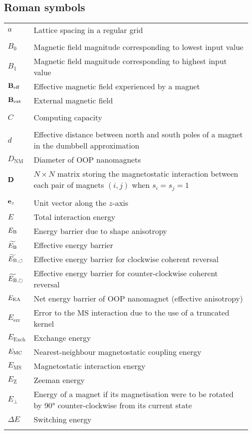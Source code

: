 \subsection*{Roman symbols}
\begin{longtable}[l]{p{60pt} p{350pt}}
	$a$ & Lattice spacing in a regular grid \\
	&\\

	$B_0$ & Magnetic field magnitude corresponding to lowest input value \\
	$B_1$ & Magnetic field magnitude corresponding to highest input value \\
	$\boldsymbol{\mathbf{B}}_\mathrm{eff}$ & Effective magnetic field experienced by a magnet \\
	$\boldsymbol{\mathbf{B}}_\mathrm{ext}$ & External magnetic field \\
	&\\
	
	$C$ & Computing capacity \\
	&\\

	$d$ & Effective distance between north and south poles of a magnet in the dumbbell approximation \\
	$D_\mathrm{NM}$ & Diameter of OOP nanomagnets \\
	$\boldsymbol{\mathbf{D}}$ & $N \times N$ matrix storing the magnetostatic interaction between each pair of magnets $(i,j)$ when $s_i=s_j=1$ \\
	&\\

	$\boldsymbol{\mathbf{e}}_z$ & Unit vector along the $z$-axis \\
	$E$ & Total interaction energy \\
	$E_\mathrm{B}$ & Energy barrier due to shape anisotropy \\ %
	$\widetilde{E_\mathrm{B}}$ & Effective energy barrier \\
	$\widetilde{E_\mathrm{B}}{}_{,\circlearrowleft}$ & Effective energy barrier for clockwise coherent reversal \\
	$\widetilde{E_\mathrm{B}}{}_{,\circlearrowright}$ & Effective energy barrier for counter-clockwise coherent reversal \\
	$E_\mathrm{EA}$ & Net energy barrier of OOP nanomagnet (effective anisotropy) \\
	$E_\mathrm{err}$ & Error to the MS interaction due to the use of a truncated kernel \\
	$E_\mathrm{Exch}$ & Exchange energy\\
	$E_\mathrm{MC}$ & Nearest-neighbour magnetostatic coupling energy \\
	$E_\mathrm{MS}$ & Magnetostatic interaction energy \\
	$E_\mathrm{Z}$ & Zeeman energy\\
	$E_\perp$ & Energy of a magnet if its magnetisation were to be rotated by \ang{90} counter-clockwise from its current state \\
	$\Delta E$ & Switching energy \\
	&\\
	

\end{longtable}
